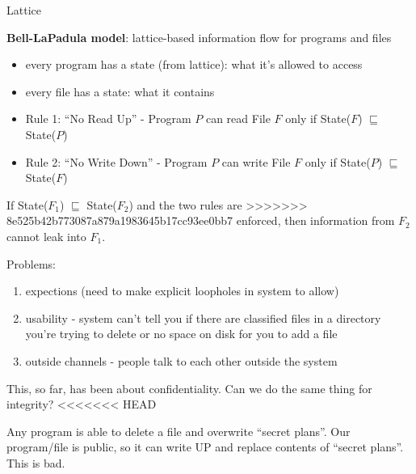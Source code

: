 \begin{definition}{Lattice}
\begin{theorem*}
{\bf Bell-LaPadula model}: lattice-based information flow for programs and files
\begin{itemize}
\item every program has a state (from lattice): what it's allowed to access
\item every file has a state: what it contains
\item Rule 1: ``No Read Up'' - Program $P$ can read File $F$ only if State($F$)
    $\sqsubseteq$ State($P$)
\item Rule 2: ``No Write Down'' - Program $P$ can write File $F$ only if
    State($P$) $\sqsubseteq$ State($F$)
\end{itemize}
\begin{theorem*} If State($F_1$) $\sqsubseteq$ State($F_2$) and the two rules are
>>>>>>> 8e525b42b773087a879a1983645b17cc93ee0bb7
enforced, then information from $F_2$ cannot leak into $F_1$.
\end{theorem*}

Problems:
\begin{enumerate}
<<<<<<< HEAD
    \item expections (need to make explicit loopholes in system to allow)
    \item usability - system can't tell you if there are classified files in a
        directory you're trying to delete or no space on disk for you to add a
        file
    \item outside channels - people talk to each other outside the system
\end{enumerate}

This, so far, has been about confidentiality. Can we do the same thing for
integrity?
<<<<<<< HEAD

\begin{example}
Any program is able to delete a file and overwrite ``secret plans''. Our program/file
is public, so it can write UP and replace contents of ``secret plans''. This is bad.
\end{example}


\end{theorem*}
\end{definition}

